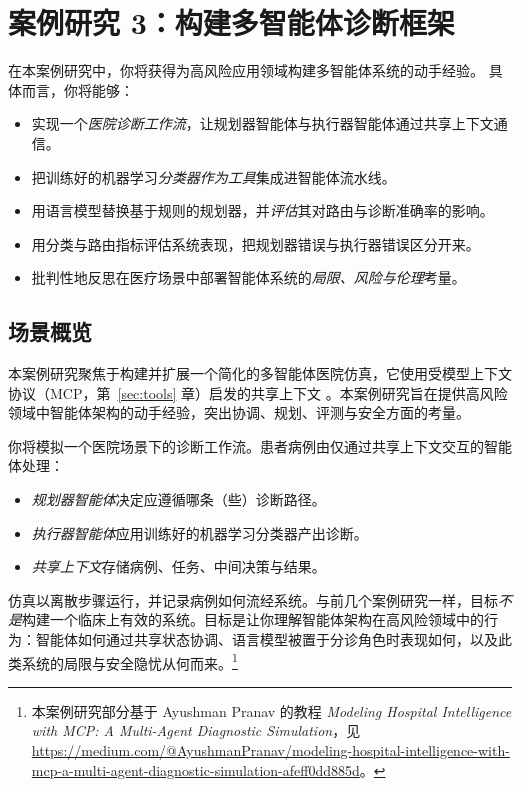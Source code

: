 
\chapter[案例研究 3：多智能体诊断]{案例研究 3：构建多智能体诊断框架}

\begin{learningbox}
在本案例研究中，你将获得为高风险应用领域构建多智能体系统的动手经验。
具体而言，你将能够：
\begin{itemize}[leftmargin=*, nosep]
    \item 实现一个{\em 医院诊断工作流}，让规划器智能体与执行器智能体通过共享上下文通信。
    \item 把训练好的机器学习{\em 分类器作为工具}集成进智能体流水线。
    \item 用语言模型替换基于规则的规划器，并{\em 评估}其对路由与诊断准确率的影响。
    \item 用分类与路由指标评估系统表现，把规划器错误与执行器错误区分开来。
    \item 批判性地反思在医疗场景中部署智能体系统的{\em 局限、风险与伦理}考量。
\end{itemize}
\end{learningbox}


\section{场景概览}

本案例研究聚焦于构建并扩展一个简化的多智能体医院仿真，它使用受模型上下文协议（MCP，第~\ref{sec:tools} 章）启发的共享上下文 \citep{xinyi2026mcp}。本案例研究旨在提供高风险领域中智能体架构的动手经验，突出协调、规划、评测与安全方面的考量。

你将模拟一个医院场景下的诊断工作流。患者病例由仅通过共享上下文交互的智能体处理：
\begin{itemize}
    \item \textit{规划器智能体}决定应遵循哪条（些）诊断路径。
    \item \textit{执行器智能体}应用训练好的机器学习分类器产出诊断。
    \item \textit{共享上下文}存储病例、任务、中间决策与结果。
\end{itemize}
仿真以离散步骤运行，并记录病例如何流经系统。与前几个案例研究一样，目标\emph{不是}构建一个临床上有效的系统。目标是让你理解智能体架构在高风险领域中的行为：智能体如何通过共享状态协调、语言模型被置于分诊角色时表现如何，以及此类系统的局限与安全隐忧从何而来。\footnote{本案例研究部分基于 Ayushman Pranav 的教程 \emph{Modeling Hospital Intelligence with MCP: A Multi-Agent Diagnostic Simulation}，见 \url{https://medium.com/@AyushmanPranav/modeling-hospital-intelligence-with-mcp-a-multi-agent-diagnostic-simulation-afeff0dd885d}。}


